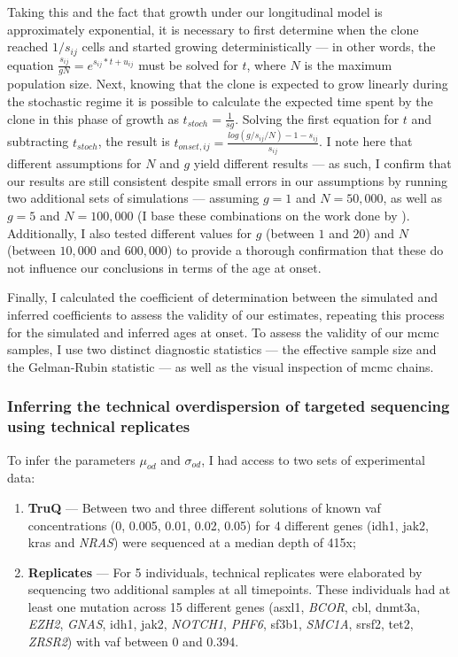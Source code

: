 Taking this and the fact that growth under our longitudinal model is approximately exponential, it is necessary to first determine when the clone reached $1/s_{ij}$ cells and started growing deterministically --- in other words, the equation $\frac{s_{ij}}{gN} = e^{s_{ij} * t + u_{ij}}$ must be solved for $t$, where $N$ is the maximum population size. Next, knowing that the clone is expected to grow linearly during the stochastic regime it is possible to calculate the expected time spent by the clone in this phase of growth as $t_{stoch} = \frac{1}{sg}$. Solving the first equation for $t$ and subtracting $t_{stoch}$, the result is $t_{onset,ij} = \frac{log(g/s_{ij}/N)-1-s_{ij}}{s_{ij}}$. I note here that different assumptions for $N$ and $g$ yield different results --- as such, I confirm that our results are still consistent despite small errors in our assumptions by running two additional sets of simulations --- assuming $g=1$ and $N=50,000$, as well as $g=5$ and $N=100,000$ (I base these combinations on the work done by  \cite{Lee-Six2018-lp}). Additionally, I also tested different values for $g$ (between $1$ and $20$) and $N$ (between $10,000$ and $600,000$) to provide a thorough confirmation that these do not influence our conclusions in terms of the age at onset.

Finally, I calculated the coefficient of determination between the simulated and inferred coefficients to assess the validity of our estimates, repeating this process for the simulated and inferred ages at onset. To assess the validity of our \ac{mcmc} samples, I use two distinct diagnostic statistics --- the effective sample size and the Gelman-Rubin statistic \cite{Gelman1992-zo} --- as well as the visual inspection of \ac{mcmc} chains.

\subsubsection{Inferring the technical overdispersion of targeted sequencing using technical replicates}

To infer the parameters $\mu_{od}$ and $\sigma_{od}$, I had access to two sets of experimental data:

\begin{enumerate}
	\item \textbf{TruQ} --- Between two and three different solutions of known \ac{vaf} concentrations (0, 0.005, 0.01, 0.02, 0.05) for 4 different genes (\ac{idh1}, \ac{jak2}, \ac{kras} and \textit{NRAS}) were sequenced at a median depth of 415x;
	
	\item \textbf{Replicates} --- For 5 individuals, technical replicates were elaborated by sequencing two additional samples at all timepoints. These individuals had at least one mutation across 15 different genes (\ac{asxl1}, \textit{BCOR}, \ac{cbl}, \ac{dnmt3a}, \textit{EZH2}, \textit{GNAS}, \ac{idh1}, \ac{jak2}, \textit{NOTCH1}, \textit{PHF6}, \ac{sf3b1}, \textit{SMC1A}, \ac{srsf2}, \ac{tet2}, \textit{ZRSR2}) with \ac{vaf} between 0 and 0.394. 
\end{enumerate}

